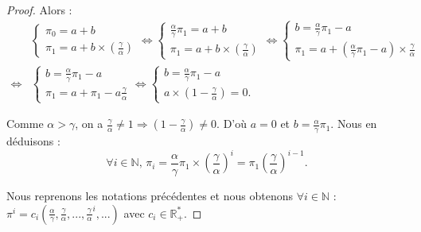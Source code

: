 \documentclass[12pt,a4paper]{report}
\theoremstyle{remark}
\begin{document}
\begin{proof}
Alors :
\begin{align*}
&\left\{
\begin{array}{ll}
  \pi_0 = a + b\\
  \pi_1 = a + b \times \left(\frac{\gamma}{\alpha}\right) 
    \end{array}
\right. 
\iff \left\{
\begin{array}{ll}
  \frac{\alpha}{\gamma}\pi_1 = a + b\\
  \pi_1 = a + b \times \left(\frac{\gamma}{\alpha}\right) 
    \end{array}
\right. 
\iff \left\{
\begin{array}{ll}
  b=\frac{\alpha}{\gamma}\pi_1-a\\
  \pi_1=a+(\frac{\alpha}{\gamma}\pi_1-a)\times \frac{\gamma}{\alpha}
    \end{array}
\right.\\
\iff &\left\{
\begin{array}{ll}
         b=\frac{\alpha}{\gamma}\pi_1-a\\
        \pi_1=a+\pi_1-a \frac{\gamma}{\alpha}
    \end{array}
\right. 
\iff \left\{
\begin{array}{ll}
        b=\frac{\alpha}{\gamma}\pi_1-a\\
        a \times(1-\frac{\gamma}{\alpha}) = 0 .
    \end{array}
\right.
\end{align*}

Comme $\alpha>\gamma$, on a $\frac{\gamma}{\alpha}\neq1 \Rightarrow (1-\frac{\gamma}{\alpha})\neq 0$.
D'où $a=0 $ et $b = \frac{\alpha}{\gamma}\pi_1$. Nous en déduisons :
$$\forall i \in \mathbb{N}, \, \pi_i =  \frac{\alpha}{\gamma}\pi_1 \times  \left(\frac{\gamma}{\alpha}\right)^i =\pi_1\left(\frac{\gamma}{\alpha}\right)^{i-1}.$$

Nous reprenons les notations précédentes et nous obtenons $\forall i \in \mathbb{N}$ :
$\pi^i = c_i \left(\frac{\alpha}{\gamma},\frac{\gamma}{\alpha},...,\frac{\gamma}{\alpha}^{i},...\right)$ avec $c_i \in\mathbb{R}_+^*.$


\end{proof}
\end{document}
